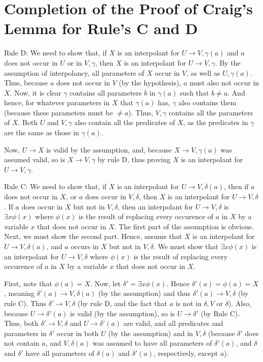 \documentclass{article}
\theoremstyle{definition}
\begin{document}
\section*{Completion of the Proof of Craig's Lemma for Rule's C and D}
Rule D: We need to show that, if $X$ is an interpolant for $U\rightarrow V,\gamma(a)$ and $a$ does not occur in $U$ or in $V,\gamma$, 
then $X$ is an interpolant for $U\rightarrow V,\gamma$. By the assumption of interpolancy, all parameters of $X$ occur in $V$, as well as 
$U,\gamma(a)$. Thus, because $a$ does not occur in $V$ (by the hypothesis), $a$ must also not occur in $X$. Now, it is clear $\gamma$ contains 
all parameters $b$ in $\gamma(a)$ such that $b\ne a$. And hence, for whatever parameters in $X$ that $\gamma(a)$ has, $\gamma$ also contains them
(because these parameters must be $\ne a$). Thus, $V,\gamma$ contains all the parameters of $X$. Both $U$ and $V,\gamma$ also contain all the predicates 
of $X$, as the predicates in $\gamma$ are the same as those in $\gamma(a)$.


Now, $U\rightarrow X$ is valid by the assumption, and, because $X\rightarrow V,\gamma(a)$ was assumed valid, so is $X\rightarrow V,\gamma$ by 
rule D, thus proving $X$ is an interpolant for $U\rightarrow V,\gamma$.


Rule C: We need to show that, if $X$ is an interpolant for $U\rightarrow V,\delta(a)$, then if 
$a$ does not occur in $X$, or $a$ does occur in $V,\delta$, then $X$ is an interpolant for $U\rightarrow V,\delta$. If $a$ does occur in $X$ but not in 
$V,\delta$, then an interpolant for $U\rightarrow V,\delta$ is $\exists x\phi(x)$ where $\phi(x)$ is the result of replacing every occurence of 
$a$ in $X$ by a variable $x$ that does not occur in $X$. The first part of the assumption is obvious. Next, we must show the second part. Hence, assume 
that $X$ is an interpolant for $U\rightarrow V,\delta(a)$, and $a$ occurs in $X$ but not in $V,\delta$. We must show that $\exists x\phi(x)$ is an 
interpolant for $U\rightarrow V,\delta$ where $\phi(x)$ is the result of replacing every occurence of $a$ in $X$ by a variable $x$ that does not occur 
in $X$.


First, note that $\phi(a)=X$. Now, let $\delta'=\exists x\phi(x)$. Hence $\delta'(a)=\phi(a)=X$, meaning 
$\delta'(a)\rightarrow V,\delta(a)$ (by the assumption) and thus $\delta'(a)\rightarrow V,\delta$ (by rule C). Thus 
$\delta'\rightarrow V,\delta$ (by rule D, and the fact that $a$ is not in $\delta,V$ or $\delta$). Also, because $U\rightarrow \delta'(a)$ is valid 
(by the assumption), so is $U\rightarrow \delta'$ (by Rule C). Thus, both $\delta'\rightarrow V,\delta$ and $U\rightarrow \delta'(a)$ are valid, 
and all predicates and parameters in $\delta'$ occur in both $U$ (by the assumption) and in $V,\delta$ (because $\delta'$ does not contain $a$, 
and $V,\delta(a)$ was assumed to have all parameters of $\delta'(a)$, and $\delta$ and $\delta'$ have all parameters of $\delta(a)$ and $\delta'(a)$, 
respectively, except $a$).
\end{document}
